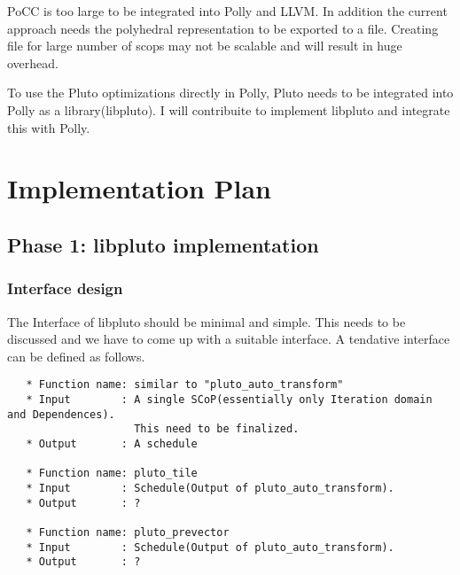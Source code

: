 \documentclass[a4paper,12pt]{article}
\begin{document}
PoCC is too large to be integrated into Polly and LLVM. In addition the current
approach needs the polyhedral representation to be exported to a file. Creating
file for large number of scops may not be scalable and will result in huge overhead.

To use the Pluto optimizations directly in Polly, Pluto needs to be integrated
into Polly as a library(libpluto). I will contribuite to implement libpluto and
integrate this with Polly.

\section{Implementation Plan}

\subsection{Phase 1: libpluto implementation}

\subsubsection{Interface design}

  The Interface of libpluto should be minimal and simple. This needs to be discussed
  and we have to come up with a suitable interface. A tendative interface can
  be defined as follows.
\begin{verbatim}
   * Function name: similar to "pluto_auto_transform"
   * Input        : A single SCoP(essentially only Iteration domain and Dependences).
                    This need to be finalized.
   * Output       : A schedule

   * Function name: pluto_tile
   * Input        : Schedule(Output of pluto_auto_transform).
   * Output       : ?

   * Function name: pluto_prevector
   * Input        : Schedule(Output of pluto_auto_transform).
   * Output       : ?
\end{verbatim}
\end{document}
